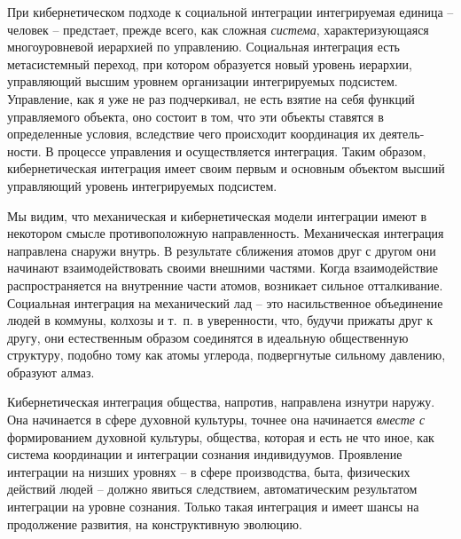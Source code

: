 \documentclass{book}
\begin{document}
При кибернетическом подходе к социальной интеграции ин­тегрируемая единица -- человек -- предстает, прежде всего, как сложная \textit{система},  характеризующаяся многоуровневой иерархией по управлению. Социальная интеграция есть метасистемный переход, при котором образуется новый уровень иерархии, управляющий высшим уровнем организации интег­рируемых подсистем. Управление, как я уже не раз подчерки­вал, не есть взятие на себя функций управляемого объекта, оно состоит в том, что эти объекты ставятся в определенные условия, вследствие чего происходит координация их деятель­ности. В процессе управления и осуществляется интеграция. Таким образом, кибернетическая интеграция имеет своим пер­вым и основным объектом высший управляющий уровень ин­тегрируемых подсистем.

Мы видим, что механическая и кибернетическая модели ин­теграции имеют в некотором смысле противоположную на­правленность. Механическая интеграция направлена снаружи внутрь. В результате сближения атомов друг с другом они на­чинают взаимодействовать своими внешними частями. Когда взаимодействие распространяется на внутренние части атомов, возникает сильное отталкивание. Социальная интеграция на механический лад -- это насильственное объединение людей в коммуны, колхозы и т.~п. в уверенности, что, будучи прижаты друг к другу, они естественным образом соединятся в идеаль­ную общественную структуру, подобно тому как атомы углерода, подвергнутые сильному давлению, образуют алмаз.

Кибернетическая интеграция общества, напротив, направ­лена изнутри наружу. Она начинается в сфере духовной куль­туры, точнее она начинается \textit{вместе с}  формированием духов­ной культуры, общества, которая и есть не что иное, как си­стема координации и интеграции сознания индивидуумов. Про­явление интеграции на низших уровнях -- в сфере производст­ва, быта, физических действий людей -- должно явиться следст­вием, автоматическим результатом интеграции на уровне со­знания. Только такая интеграция и имеет шансы на продолже­ние развития, на конструктивную эволюцию.
\end{document}
